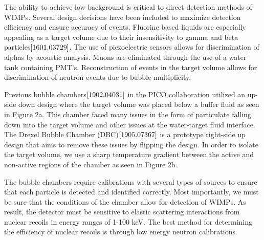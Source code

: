 \documentclass[%
12pt,
twoside,
reprint,
amsmath,amssymb,
aps,
]{article}
\begin{document}
	\par The ability to achieve low background is critical to direct detection methods of WIMPs. Several design decisions have been included to maximize detection efficiency and ensure accuracy of events. Fluorine based liquids are especially appealing as a target volume due to their insensitivity to gamma and beta particles${\cite{1601.03729}}$. The use of piezoelectric sensors allows for discrimination of alphas by acoustic analysis. Muons are eliminated through the use of a water tank containing PMT's. Reconstruction of events in the target volume allows for discrimination of neutron events due to bubble multiplicity. 
	\par Previous bubble chambers${\cite{1902.04031}}$ in the PICO collaboration utilized an up-side down design where the target volume was placed below a buffer fluid as seen in Figure 2a. This chamber faced many issues in the form of particulate falling down into the target volume and other issues at the water-target fluid interface. The Drexel Bubble Chamber (DBC)$\cite{1905.07367}$ is a prototype right-side up design that aims to remove these issues by flipping the design. In order to isolate the target volume, we use a sharp temperature gradient between the active and non-active regions of the chamber as seen in Figure 2b.
	\par The bubble chambers require calibrations with several types of sources to ensure that each particle is detected and identified correctly. Most importantly, we must be sure that the conditions of the chamber allow for detection of WIMPs. As result, the detector must be sensitive to elastic scattering interactions from nuclear recoils in energy ranges of 1-100 keV. The best method for determining the efficiency of nuclear recoils is through low energy neutron calibrations. 
	
\end{document}
